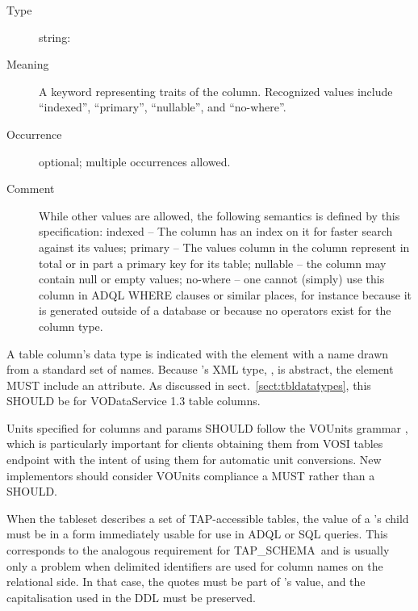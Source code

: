 \documentclass[11pt,a4paper]{ivoa}
\newcommand{\tapschema}{TAP\_SCHE\-MA}
\newcommand{\tapschema}{\mbox{%
  TAP\discretionary{-}{}{\kern-2pt\_}SCHEMA}}
\begin{document}
\begin{generated}
\begin{bigdescription}
\begin{description}
\end{description}
\item[Element \xmlel{flag}]
\begin{description}
\item[Type] string: 
\item[Meaning] A keyword representing traits of the column.
                        Recognized values include “indexed”, “primary”,
                        “nullable”, and “no-where”.
\item[Occurrence] optional; multiple occurrences allowed.
\item[Comment] While other values are allowed, the following semantics
                     	is defined by this specification: indexed – The column
                     	has an index on it for faster search against its values;
                     	primary – The values column in the column represent in
                     	total or in part a primary key for its table; nullable –
                     	the column may contain null or empty values;
                     	no-where – one cannot (simply) use this column in
                     	ADQL WHERE clauses or similar places, for instance
                     	because it is generated outside of a database or
                     	because no operators exist for the column type.

\end{description}


\end{bigdescription}\endgroup

\endgroup
\end{generated}



A table column's data type is indicated with the 
element with a name drawn from a standard set of names.
Because 's
XML type, , is abstract, the
element MUST include an
 attribute.  As discussed in
sect.~\ref{sect:tbldatatypes}, this SHOULD be
 for VODataService 1.3 table columns.

Units specified for columns and params SHOULD follow the VOUnits grammar
\citep{2023ivoa.spec.1215G}, which is particularly important for clients
obtaining them from VOSI tables endpoint with the intent of using them
for automatic unit conversions.  New implementors should consider
VOUnits compliance a MUST rather than a SHOULD.

When the tableset describes a set of TAP-accessible tables, the value of
a 's  child must be in a form immediately
usable for use in ADQL or SQL queries. This corresponds to the analogous
requirement for \tapschema\ and is usually only a problem when delimited
identifiers are used for column names on the relational side.  In that
case, the quotes must be part of 's value, and the
capitalisation used in the DDL must be preserved.
\end{document}
